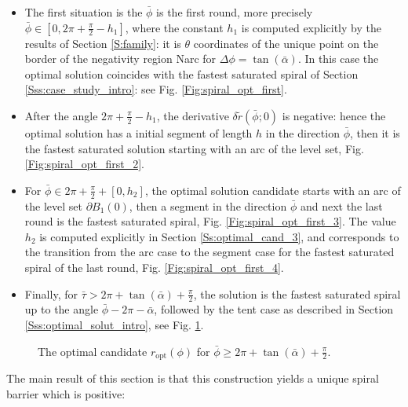 \documentclass[reqno]{amsart}
\theoremstyle{definition} \newtheorem{definition}{Definition}[section]
\theoremstyle{definition} \newtheorem{remark}[definition]{Remark}
\theoremstyle{plain} \newtheorem{lemma}[definition]{Lemma}
\theoremstyle{plain} \newtheorem{proposition}[definition]{Proposition}
\theoremstyle{plain} \newtheorem{theorem}[definition]{Theorem}
\theoremstyle{plain} \newtheorem{corollary}[definition]{Corollary}
\theoremstyle{definition} \newtheorem{example}[definition]{Example}
\theoremstyle{plain} \newtheorem{claim}[clai]{Claim}
\theoremstyle{definition} \newtheorem{assumption}[definition]{Assumption}
\theoremstyle{definition} \newtheorem{observation}[definition]{Observation}
\newcommand{\1}{\mathbbm 1}
\numberwithin{equation}{section} %
\theoremstyle{plain} \newtheorem*{theorem*}{Theorem}
\theoremstyle{plain} \newtheorem{mthm}[maintheorem]{Main Theorem}
\theoremstyle{plain} \newtheorem*{mthm*}{Main Theorem}
\theoremstyle{plain} \newtheorem*{conjecture*}{Conjecture}
\theoremstyle{plain} \newtheorem{conjecture}[definition]{Conjecture}
\theoremstyle{plain} \newtheorem*{problem*}{Problem}
\begin{document}
\begin{itemize}
\item The first situation is the $\bar \phi$ is the first round, more precisely $\bar \phi \in [0,2\pi + \frac{\pi}{2} - h_1]$, where the constant $h_1$ is computed explicitly by the results of Section \ref{S:family}: it is $\theta$ coordinates of the unique point on the border of the negativity region \gls{Narc} for $\Delta \phi = \tan(\bar \alpha)$. In this case the optimal solution coincides with the fastest saturated spiral of Section \ref{Sss:case_study_intro}: see Fig. \ref{Fig:spiral_opt_first}. 
\item After the angle $2\pi + \frac{\pi}{2} - h_1$, the derivative $\delta \tilde r(\bar \phi;0)$ is negative: hence the optimal solution has a initial segment of length $h$ in the direction $\bar \phi$, then it is the fastest saturated solution starting with an arc of the level set, Fig. \ref{Fig:spiral_opt_first_2}.
\item For $\bar \phi \in 2\pi + \frac{\pi}{2} + [0,h_2]$, the optimal solution candidate starts with an arc of the level set $\partial B_1(0)$, then a segment in the direction $\bar \phi$ and next the last round is the fastest saturated spiral, Fig. \ref{Fig:spiral_opt_first_3}. The value $h_2$ is computed explicitly in Section \ref{Ss:optimal_cand_3}, and corresponds to the transition from the arc case to the segment case for the fastest saturated spiral of the last round, Fig. \ref{Fig:spiral_opt_first_4}.
\item Finally, for $\bar \tau > 2\pi + \tan(\bar \alpha) + \frac{\pi}{2}$, the solution is the fastest saturated spiral up to the angle $\bar \phi - 2\pi - \bar \alpha$, followed by the tent case as described in Section \ref{Sss:optimal_solut_intro}, see Fig. \ref{Fig:opt_sol_3_tent_intro}.
\end{itemize}







\begin{figure}
\resizebox{.75\textwidth}{!}{}
\caption{The optimal candidate $r_\mathrm{opt}(\phi)$ for $\bar \phi \geq 2\pi + \tan(\bar \alpha) + \frac{\pi}{2}$.}
\label{Fig:opt_sol_3_tent_intro}
\end{figure}



The main result of this section is that this construction yields a unique spiral barrier which is positive:
\end{document}
